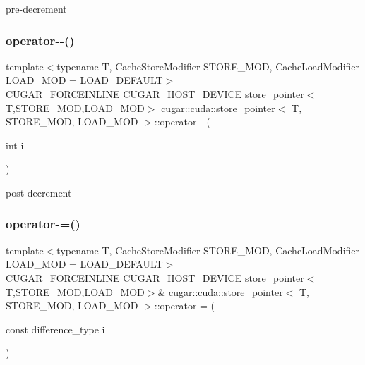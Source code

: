 pre-\/decrement \mbox{\label{structcugar_1_1cuda_1_1store__pointer_a04163d0b7bb5d4ae359a2093f95ee157}} 
\subsubsection{\texorpdfstring{operator-\/-\/()}{operator--()}\hspace{0.1cm}{\footnotesize\ttfamily [2/2]}}
{\footnotesize\ttfamily template$<$typename T, Cache\+Store\+Modifier S\+T\+O\+R\+E\+\_\+\+M\+OD, Cache\+Load\+Modifier L\+O\+A\+D\+\_\+\+M\+OD = L\+O\+A\+D\+\_\+\+D\+E\+F\+A\+U\+LT$>$ \\
C\+U\+G\+A\+R\+\_\+\+F\+O\+R\+C\+E\+I\+N\+L\+I\+NE C\+U\+G\+A\+R\+\_\+\+H\+O\+S\+T\+\_\+\+D\+E\+V\+I\+CE \hyperlink{structcugar_1_1cuda_1_1store__pointer}{store\+\_\+pointer}$<$T,S\+T\+O\+R\+E\+\_\+\+M\+OD,L\+O\+A\+D\+\_\+\+M\+OD$>$ \hyperlink{structcugar_1_1cuda_1_1store__pointer}{cugar\+::cuda\+::store\+\_\+pointer}$<$ T, S\+T\+O\+R\+E\+\_\+\+M\+OD, L\+O\+A\+D\+\_\+\+M\+OD $>$\+::operator-\/-\/ (\begin{DoxyParamCaption}\item[{int}]{i }\end{DoxyParamCaption})\hspace{0.3cm}{\ttfamily [inline]}}

post-\/decrement \mbox{\label{structcugar_1_1cuda_1_1store__pointer_af80834aa861910066553de8f040f7bb2}} 
\subsubsection{\texorpdfstring{operator-\/=()}{operator-=()}}
{\footnotesize\ttfamily template$<$typename T, Cache\+Store\+Modifier S\+T\+O\+R\+E\+\_\+\+M\+OD, Cache\+Load\+Modifier L\+O\+A\+D\+\_\+\+M\+OD = L\+O\+A\+D\+\_\+\+D\+E\+F\+A\+U\+LT$>$ \\
C\+U\+G\+A\+R\+\_\+\+F\+O\+R\+C\+E\+I\+N\+L\+I\+NE C\+U\+G\+A\+R\+\_\+\+H\+O\+S\+T\+\_\+\+D\+E\+V\+I\+CE \hyperlink{structcugar_1_1cuda_1_1store__pointer}{store\+\_\+pointer}$<$T,S\+T\+O\+R\+E\+\_\+\+M\+OD,L\+O\+A\+D\+\_\+\+M\+OD$>$\& \hyperlink{structcugar_1_1cuda_1_1store__pointer}{cugar\+::cuda\+::store\+\_\+pointer}$<$ T, S\+T\+O\+R\+E\+\_\+\+M\+OD, L\+O\+A\+D\+\_\+\+M\+OD $>$\+::operator-\/= (\begin{DoxyParamCaption}\item[{const difference\+\_\+type}]{i }\end{DoxyParamCaption})\hspace{0.3cm}{\ttfamily [inline]}}

